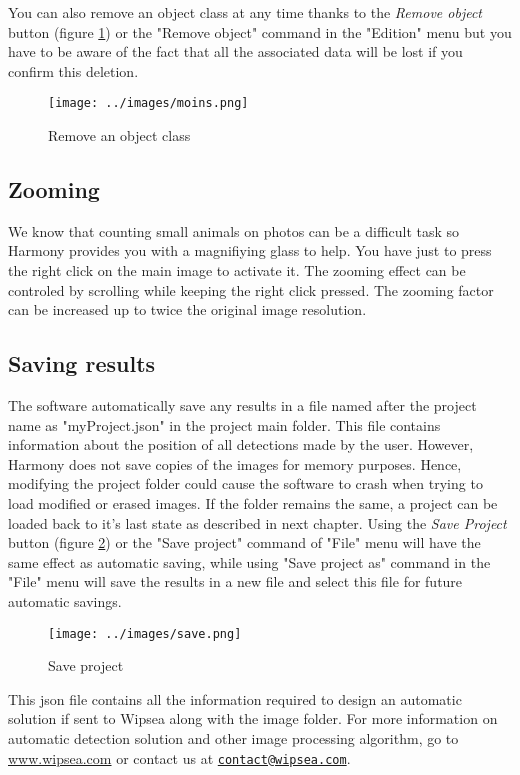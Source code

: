 \documentclass{article}
\begin{document}
You can also remove an object class at any time thanks to the \emph{Remove object} button (figure \ref{fig:RemoveObject}) or the "Remove object" command in the "Edition" menu but you have to be aware of the fact that all the associated data will be lost if you confirm this deletion.
\begin{figure}[!h]
  \centering
  \texttt{[image: ../images/moins.png]}
  \caption{\label{fig:RemoveObject} Remove an object class }
\end{figure}

\subsection{Zooming}
We know that counting small animals on photos can be a difficult task so Harmony provides you with a magnifiying glass to help. You have just to press the right click on the main image to activate it. The zooming effect can be controled by scrolling while keeping the right click pressed. The zooming factor can be increased up to twice the original image resolution.

\subsection{Saving results}
The software automatically save any results in a file named after the project name as "myProject.json" in the project main folder. This file contains information about the position of all detections made by the user. However, Harmony does not save copies of the images for memory purposes. Hence, modifying the project folder could cause the software to crash when trying to load modified or erased images. If the folder remains the same, a project can be loaded back to it's last state as described in next chapter. Using the \emph{Save Project} button (figure \ref{fig:SaveProject}) or the "Save project" command of "File" menu will have the same effect as automatic saving, while using "Save project as" command in the "File" menu will save the results in a new file and select this file for future automatic savings.

\begin{figure}[!h]
  \centering
  \texttt{[image: ../images/save.png]}
  \caption{\label{fig:SaveProject} Save project }
\end{figure}

This json file contains all the information required to design an automatic solution if sent to Wipsea along with the image folder. For more information on automatic detection solution and other image processing algorithm, go to \url{www.wipsea.com} or contact us at \href{mailto:contact@wipsea.com}{\nolinkurl{contact@wipsea.com}}.
\end{document}

